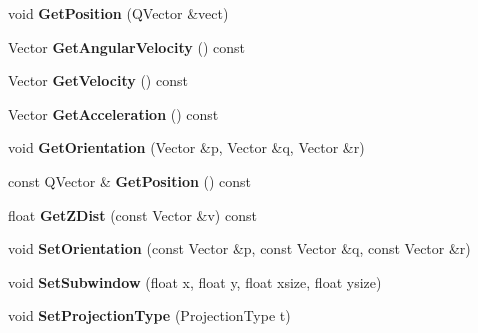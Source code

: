 \begin{DoxyCompactItemize}
\item 
void {\bfseries Get\+Position} (Q\+Vector \&vect)\hypertarget{classCamera_a813ec89a24c2b6556573a2316f0d5a6d}{}\label{classCamera_a813ec89a24c2b6556573a2316f0d5a6d}

\item 
Vector {\bfseries Get\+Angular\+Velocity} () const \hypertarget{classCamera_a55547cff21848600f2ff7d63a412b176}{}\label{classCamera_a55547cff21848600f2ff7d63a412b176}

\item 
Vector {\bfseries Get\+Velocity} () const \hypertarget{classCamera_a407b7427c1267b9e34ecfadb6be1cc53}{}\label{classCamera_a407b7427c1267b9e34ecfadb6be1cc53}

\item 
Vector {\bfseries Get\+Acceleration} () const \hypertarget{classCamera_aa3d451aa82c38df35196f7284d8a46d2}{}\label{classCamera_aa3d451aa82c38df35196f7284d8a46d2}

\item 
void {\bfseries Get\+Orientation} (Vector \&p, Vector \&q, Vector \&r)\hypertarget{classCamera_a54c0e84d1752b064d8f9f8afe9949545}{}\label{classCamera_a54c0e84d1752b064d8f9f8afe9949545}

\item 
const Q\+Vector \& {\bfseries Get\+Position} () const \hypertarget{classCamera_a814164b580663ec5fa11f2e730f4acc6}{}\label{classCamera_a814164b580663ec5fa11f2e730f4acc6}

\item 
float {\bfseries Get\+Z\+Dist} (const Vector \&v) const \hypertarget{classCamera_a79cef6906d202291be0f38d47f281669}{}\label{classCamera_a79cef6906d202291be0f38d47f281669}

\item 
void {\bfseries Set\+Orientation} (const Vector \&p, const Vector \&q, const Vector \&r)\hypertarget{classCamera_ab8df07f549ee35053aff02be96f75b1c}{}\label{classCamera_ab8df07f549ee35053aff02be96f75b1c}

\item 
void {\bfseries Set\+Subwindow} (float x, float y, float xsize, float ysize)\hypertarget{classCamera_a794aa2a0e60327707ac765eb0011ddee}{}\label{classCamera_a794aa2a0e60327707ac765eb0011ddee}

\item 
void {\bfseries Set\+Projection\+Type} (Projection\+Type t)\hypertarget{classCamera_ad722ad237a9fec650080739d1e7809f3}{}\label{classCamera_ad722ad237a9fec650080739d1e7809f3}


\end{DoxyCompactItemize}
